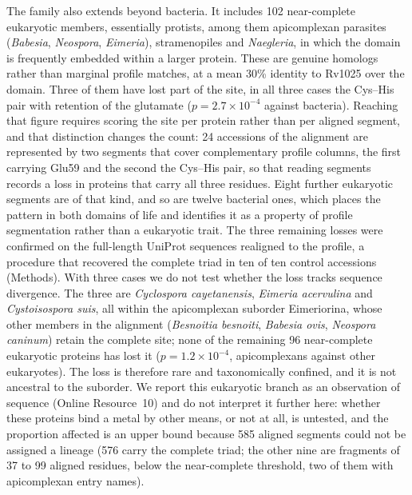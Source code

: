 \documentclass[11pt,a4paper]{article}
\begin{document}
The family also extends beyond bacteria. It includes 102 near-complete eukaryotic members, essentially protists, among them apicomplexan parasites (\textit{Babesia}, \textit{Neospora}, \textit{Eimeria}), stramenopiles and \textit{Naegleria}, in which the domain is frequently embedded within a larger protein. These are genuine homologs rather than marginal profile matches, at a mean 30\% identity to Rv1025 over the domain. Three of them have lost part of the site, in all three cases the Cys--His pair with retention of the glutamate ($p=2.7\times10^{-4}$ against bacteria). Reaching that figure requires scoring the site per protein rather than per aligned segment, and that distinction changes the count: 24 accessions of the alignment are represented by two segments that cover complementary profile columns, the first carrying Glu59 and the second the Cys--His pair, so that reading segments records a loss in proteins that carry all three residues. Eight further eukaryotic segments are of that kind, and so are twelve bacterial ones, which places the pattern in both domains of life and identifies it as a property of profile segmentation rather than a eukaryotic trait. The three remaining losses were confirmed on the full-length UniProt sequences realigned to the profile, a procedure that recovered the complete triad in ten of ten control accessions (Methods). With three cases we do not test whether the loss tracks sequence divergence. The three are \textit{Cyclospora cayetanensis}, \textit{Eimeria acervulina} and \textit{Cystoisospora suis}, all within the apicomplexan suborder Eimeriorina, whose other members in the alignment (\textit{Besnoitia besnoiti}, \textit{Babesia ovis}, \textit{Neospora caninum}) retain the complete site; none of the remaining 96 near-complete eukaryotic proteins has lost it ($p=1.2\times10^{-4}$, apicomplexans against other eukaryotes). The loss is therefore rare and taxonomically confined, and it is not ancestral to the suborder. We report this eukaryotic branch as an observation of sequence (Online Resource~10) and do not interpret it further here: whether these proteins bind a metal by other means, or not at all, is untested, and the proportion affected is an upper bound because 585 aligned segments could not be assigned a lineage (576 carry the complete triad; the other nine are fragments of 37 to 99 aligned residues, below the near-complete threshold, two of them with apicomplexan entry names).
\end{document}
